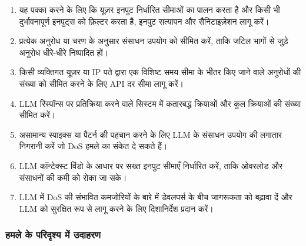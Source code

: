 \documentclass[
]{article}
\providecommand{\tightlist}{%
  \setlength{\itemsep}{0pt}\setlength{\parskip}{0pt}}
\begin{document}
\begin{enumerate}
\def\labelenumi{\arabic{enumi}.}
\tightlist
\item
  यह पक्का करने के लिए कि यूज़र इनपुट निर्धारित सीमाओं का पालन करता है और किसी भी
  दुर्भावनापूर्ण इनपुट्स को फ़िल्टर करता है, इनपुट सत्यापन और सैनिटाइज़ेशन लागू करें।
\item
  प्रत्येक अनुरोध या चरण के अनुसार संसाधन उपयोग को सीमित करें, ताकि जटिल भागों से
  जुड़े अनुरोध धीरे-धीरे निष्पादित हों।
\item
  किसी व्यक्तिगत यूज़र या IP पते द्वारा एक विशिष्ट समय सीमा के भीतर किए जाने वाले
  अनुरोधों की संख्या को सीमित करने के लिए API दर सीमा लागू करें।
\item
  LLM रिस्पॉन्स पर प्रतिक्रिया करने वाले सिस्टम में कतारबद्ध क्रियाओं और कुल क्रियाओं
  की संख्या सीमित करें।
\item
  असामान्य स्पाइक्स या पैटर्न की पहचान करने के लिए LLM के संसाधन उपयोग की लगातार
  निगरानी करें जो DoS हमले का संकेत दे सकते हैं।
\item
  LLM कॉन्टेक्स्ट विंडो के आधार पर सख्त इनपुट सीमाएँ निर्धारित करें, ताकि ओवरलोड और
  संसाधनों की कमी को रोका जा सके।
\item
  LLM में DoS की संभावित कमजोरियों के बारे में डेवलपर्स के बीच जागरूकता को बढ़ावा दें
  और LLM को सुरक्षित रूप से लागू करने के लिए दिशानिर्देश प्रदान करें।
\end{enumerate}

\subsubsection{हमले के परिदृश्य में
उदाहरण}\label{ux939ux92eux932-ux915-ux92aux930ux926ux936ux92f-ux92e-ux909ux926ux939ux930ux923}
\end{document}
